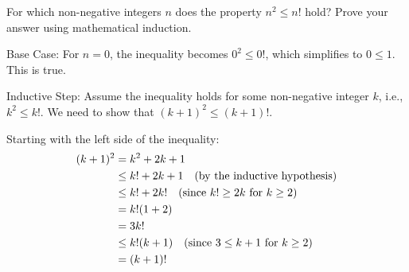 \documentclass[a4paper]{exam}
\begin{document}
\begin{questions}

\question For which non-negative integers $n$ does the property $n^2 \le n!$ hold? Prove your answer using mathematical induction.
  \begin{solution}
    Base Case: For \( n = 0 \), the inequality becomes \( 0^2 \leq 0! \), which simplifies to \( 0 \leq 1 \). This is true.

Inductive Step: Assume the inequality holds for some non-negative integer \( k \), i.e., \( k^2 \leq k! \). We need to show that \( (k+1)^2 \leq (k+1)! \).

Starting with the left side of the inequality:
\begin{align*}
(k+1)^2 &= k^2 + 2k + 1 \\
&\leq k! + 2k + 1 \quad \text{(by the inductive hypothesis)} \\
&\leq k! + 2k! \quad \text{(since \( k! \geq 2k \) for \( k \geq 2 \))} \\
&= k!(1 + 2) \\
&= 3k! \\
&\leq k!(k + 1) \quad \text{(since \( 3 \leq k + 1 \) for \( k \geq 2 \))} \\
&= (k+1)!
\end{align*}


\end{solution}
\end{questions}
\end{document}
